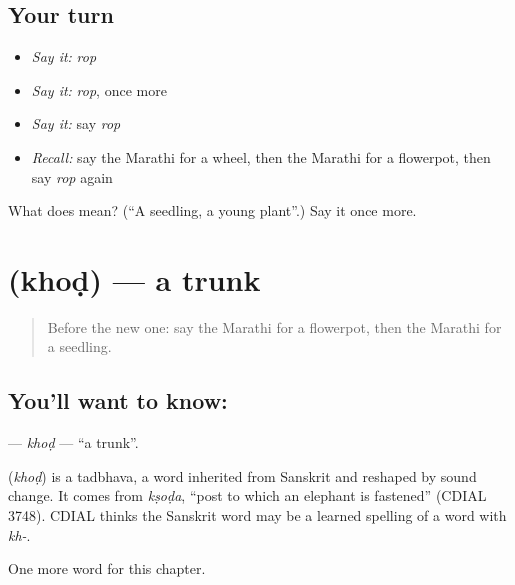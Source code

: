 \subsection*{Your turn}
\begin{itemize}
\raggedright
  \item \emph{Say it:} \emph{rop}
  \item \emph{Say it:} \emph{rop}, once more
  \item \emph{Say it:} say \emph{rop}
  \item \emph{Recall:} say the Marathi for a wheel, then the Marathi for a flowerpot, then say \emph{rop} again
\end{itemize}

\begin{tcolorbox}[breakable,colback=teal!4,colframe=teal!35!black,title={Before you move on}]
What does  mean? (\textquotedblleft{}A seedling, a young plant\textquotedblright{}.) Say it once more.
\end{tcolorbox}
\section[\texorpdfstring{\mr{खोड} (khoḍ)}{खोड (khoḍ)}]{ (khoḍ) — a trunk}

\label{lesson:MR-C241-khod}



\begin{quote}
Before the new one: say the Marathi for a flowerpot, then the Marathi for a seedling.
\end{quote}

\subsection*{You'll want to know: }
\textbf{} — \emph{khoḍ} — \textquotedblleft{}a trunk\textquotedblright{}.

\begin{cousinweb}
\textbf{} (\emph{khoḍ}) is a tadbhava, a word inherited from Sanskrit and reshaped by sound change. It comes from \emph{kṣoḍa}, \textquotedblleft{}post to which an elephant is fastened\textquotedblright{} (CDIAL 3748). CDIAL thinks the Sanskrit word may be a learned spelling of a word with \emph{kh-}.
\end{cousinweb}

\begin{grammarlens}[title={What you've built}]
One more word for this chapter.
\end{grammarlens}

